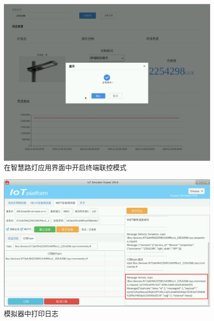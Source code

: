\begin{figure}[!htbp]
\centering
\includegraphics[width=\textwidth]{figures/序列 01.00_21_29_56.Still016.png}
\caption{在智慧路灯应用界面中开启终端联控模式}\label{在智慧路灯应用界面中开启终端联控模式}
\end{figure}

\begin{figure}[!htbp]
\centering
\includegraphics[width=\textwidth]{figures/序列 01.00_21_51_48.Still017.png}
\caption{模拟器中打印日志}\label{模拟器中打印日志}
\end{figure}

